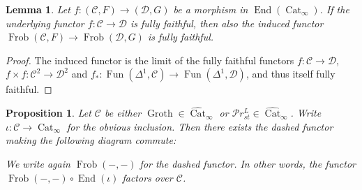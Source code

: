 \documentclass{article}
\theoremstyle{definition}
\theoremstyle{definition}
\theoremstyle{definition}
\theoremstyle{plain}
\newtheorem{lem}[defn]{Lemma}
\theoremstyle{plain}
\theoremstyle{plain}
\theoremstyle{plain}
\theoremstyle{plain}
\theoremstyle{plain}
\newtheorem{prop}[defn]{Proposition}
\theoremstyle{plain}
\theoremstyle{plain}
\theoremstyle{remark}
\theoremstyle{remark}
\theoremstyle{plain}
\theoremstyle{plain}
\theoremstyle{plain}
\theoremstyle{plain}
\theoremstyle{plain}
\newcommand{\Frob}[2]{\operatorname{Frob}(#1, #2)}
\newcommand{\End}[1]{\operatorname{End}(#1)}
\newcommand{\Cat}[1]{\mathcal{#1}}
\newcommand{\Fun}[2]{\operatorname{Fun}({#1},{#2})}
\newcommand{\CatInf}{\operatorname{Cat}_{\infty}}
\newcommand{\CatInfHuge}{\widehat{\operatorname{Cat}}_{\infty}}
\newcommand{\Groth}{\operatorname{Groth}}
\newcommand{\PrSt}{\mathcal{P}r^{L}_{st}}
\begin{document}
\begin{lem} \label{lem:functoriality:frob-functor-fully-faithful}
    Let $f \colon (\Cat C, F) \to (\Cat D, G)$ be a morphism in $\End{\CatInf}$.
    If the underlying functor $f \colon \Cat C \to \Cat D$ is fully faithful,
    then also the induced functor $\Frob{\Cat C}{F} \to \Frob{\Cat D}{G}$ is fully faithful.
\end{lem}
\begin{proof}
    The induced functor is the limit of the fully faithful functors 
    ${f \colon \Cat C \to \Cat D}$, $f \times f \colon \Cat C^2 \to \Cat D^2$
    and $f_* \colon \Fun{\Delta^1}{\Cat C} \to \Fun{\Delta^1}{\Cat D}$,
    and thus itself fully faithful.
\end{proof}

\begin{prop} \label{lem:functoriality:frob-functor-on-groth-prst}
    Let $\Cat C$ be either $\Groth \in \CatInfHuge$ or $\PrSt \in \CatInfHuge$.
    Write $\iota \colon \Cat C \to \CatInf$ for the obvious inclusion.
    Then there exists the dashed functor making the following diagram commute:
    \begin{center}
    \end{center}
    We write again $\Frob{-}{-}$ for the dashed functor.
    In other words, the functor $\Frob{-}{-} \circ \End{\iota}$ factors over $\Cat C$. 
\end{prop}
\end{document}
